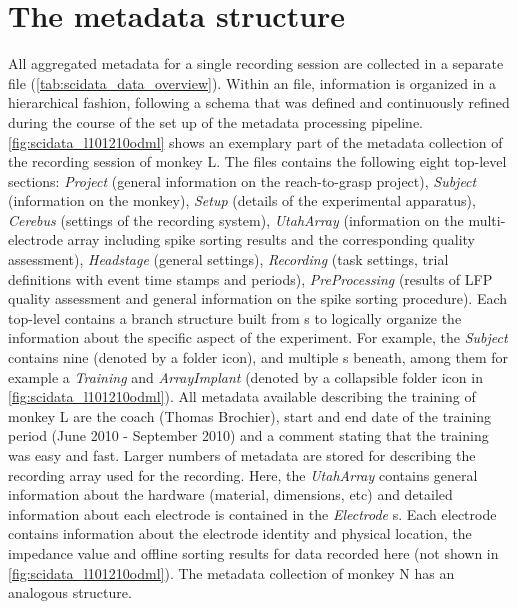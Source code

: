 \section{The metadata structure}
\label{sec:scidata_metadata_structure}
All aggregated metadata for a single recording session are collected in a separate  file (\cref{tab:scidata_data_overview}). Within an  file, information is organized in a hierarchical fashion, following a schema that was defined and continuously refined during the course of the set up of the metadata processing pipeline. \cref{fig:scidata_l101210odml} shows an exemplary part of the metadata collection of the recording session of monkey L. The  files contains the following eight top-level sections: \textit{Project} (general information on the reach-to-grasp project), \textit{Subject} (information on the monkey), \textit{Setup} (details of the experimental apparatus), \textit{Cerebus} (settings of the recording system), \textit{UtahArray} (information on the multi-electrode array including spike sorting results and the corresponding quality assessment), \textit{Headstage} (general settings), \textit{Recording} (task settings, trial definitions with event time stamps and periods), \textit{PreProcessing} (results of LFP quality assessment and general information on the spike sorting procedure).
Each top-level  contains a branch structure built from s to logically organize the information about the specific aspect of the experiment. For example, the \textit{Subject}  contains nine  (denoted by a folder icon), and multiple s beneath, among them for example a  \textit{Training}  and \textit{ArrayImplant}  (denoted by a collapsible folder icon in \cref{fig:scidata_l101210odml}). All metadata available describing the training of monkey L are the coach (Thomas Brochier), start and end date of the training period (June 2010 - September 2010) and a comment stating that the training was easy and fast. Larger numbers of metadata are stored for describing the recording array used for the recording. Here, the  \textit{UtahArray} contains general information about the hardware (material, dimensions, etc) and detailed information about each electrode is contained in the \textit{Electrode} s. Each electrode  contains information about the electrode identity and physical location, the impedance value and offline sorting results for data recorded here (not shown in \cref{fig:scidata_l101210odml}). The metadata collection of monkey N has an analogous structure.

